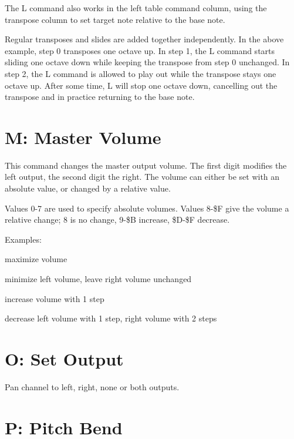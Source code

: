 The L command also works in the left table command column, using the transpose column to set target note relative to the base note.

\begin{figure}[htbp]
	\begin{center}
	\end{center}
\end{figure}

Regular transposes and slides are added together independently. In the above example, step 0 transposes one octave up. In step 1, the L command starts sliding one octave down while keeping the transpose from step 0 unchanged. In step 2, the L command is allowed to play out while the transpose stays one octave up. After some time, L will stop one octave down, cancelling out the transpose and in practice returning to the base note.

\section{M: Master Volume}

This command changes the master output volume. The first digit modifies the left output, the second digit the right. The volume can either be set with an absolute value, or changed by a relative value.

Values 0-7 are used to specify absolute volumes. Values 8-\$F give the volume a relative change; 8 is no change, 9-\$B increase, \$D-\$F decrease.

\begin{description}
\item Examples:
\item[M77] maximize volume
\item[M08] minimize left volume, leave right volume unchanged
\item[M99] increase volume with 1 step
\item[MFE] decrease left volume with 1 step, right volume with 2 steps
\end{description}

\section{O: Set Output}

Pan channel to left, right, none or both outputs.

\section{P: Pitch Bend}

